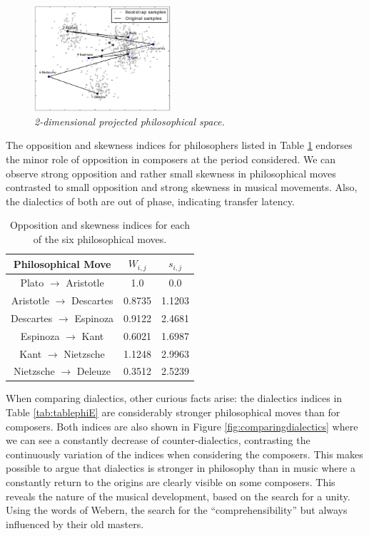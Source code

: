 \documentclass[
 aip,
 jmp,
 amsmath,amssymb,
 reprint,
]{revtex4-1}
\begin{document}
\begin{figure}
  \begin{center}
    \includegraphics[width=0.45\textwidth]{g1filosofos}
  \end{center}
  \caption{\it 2-dimensional projected philosophical space.}
  \label{fig:phipca}
\end{figure}

The opposition and skewness indices for philosophers listed in Table
\ref{tab:tablephiOI} endorses the minor role of opposition in
composers at the period considered. We can observe strong opposition and rather small skewness 
in philosophical moves contrasted to small opposition and strong skewness in
musical movements. Also, the dialectics of both are out of
phase, indicating transfer latency. 

\begin{table}%
\caption{\label{tab:tablephiOI}Opposition and skewness indices for each
of the six philosophical moves.}

\begin{tabular}{|c||c|c|}
\hline
Philosophical Move & $W_{i,j}$ & $s_{i,j}$ \\
\hline \hline
Plato $\rightarrow$ Aristotle     & 1.0    & 0.0 \\
Aristotle $\rightarrow$ Descartes & 0.8735 & 1.1203 \\
Descartes $\rightarrow$ Espinoza  & 0.9122 & 2.4681 \\
Espinoza $\rightarrow$ Kant       & 0.6021 & 1.6987 \\
Kant $\rightarrow$ Nietzsche      & 1.1248 & 2.9963 \\
Nietzsche $\rightarrow$ Deleuze   & 0.3512 & 2.5239 \\
\hline
\end{tabular}
\end{table}

When comparing dialectics, other curious facts arise: the dialectics
indices in Table \ref{tab:tablephiE} are considerably stronger philosophical moves than for
composers. Both indices are also shown in Figure
\ref{fig:comparingdialectics} where we can see a constantly decrease
of counter-dialectics, contrasting the continuously variation of the
indices when considering the composers. This makes possible to argue
that dialectics is stronger in philosophy than in music where a
constantly return to the origins are clearly visible on some
composers. This reveals the nature of the
musical development, based on the search for a unity. Using the words
of Webern, the search for the ``comprehensibility'' but always
influenced by their old masters.
\end{document}
